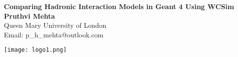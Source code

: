 \documentclass[a0,portrait]{a0poster}
\begin{document}



\begin{minipage}[b]{0.75\linewidth}

\VeryHuge \color{MediumPurple4} \textbf{Comparing Hadronic Interaction \newline Models in Geant 4 Using WCSim} \color{Maroon0}\\ %
\newline\huge \textbf{Pruthvi Mehta}\\[0.5cm] %
\huge Queen Mary University of London\\[0.4cm] %
\large Email: p\_h\_mehta@outlook.com

\end{minipage}
%
\begin{minipage}[b]{0.25\linewidth}
\texttt{[image: logo1.png]}\\
\end{minipage}

\vspace{1cm} %

\end{document}
